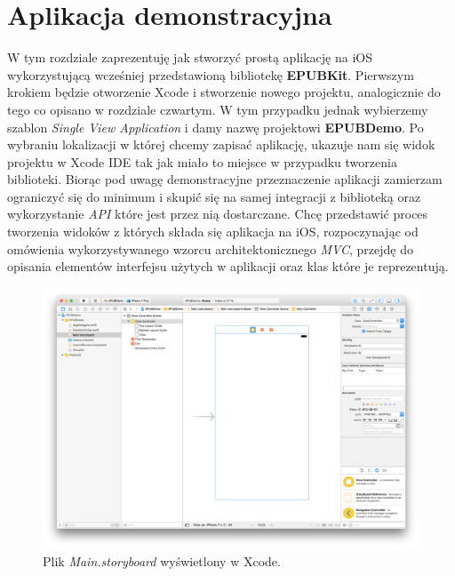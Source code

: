\chapter{Aplikacja demonstracyjna}

W tym rozdziale zaprezentuję jak stworzyć prostą aplikację na iOS wykorzystującą wcześniej przedstawioną bibliotekę \textbf{EPUBKit}. Pierwszym krokiem będzie otworzenie Xcode i stworzenie nowego projektu, analogicznie do tego co opisano w rozdziale czwartym. W tym przypadku jednak wybierzemy szablon \textit{Single View Application} i damy nazwę projektowi \textbf{EPUBDemo}. Po wybraniu lokalizacji w której chcemy zapisać aplikację, ukazuje nam się widok projektu w Xcode IDE tak jak miało to miejsce w przypadku tworzenia biblioteki. Biorąc pod uwagę demonstracyjne przeznaczenie aplikacji zamierzam ograniczyć się do minimum i skupić się na samej integracji z biblioteką oraz wykorzystanie \textit{API} które jest przez nią dostarczane. Chcę przedstawić proces tworzenia widoków z których składa się aplikacja na iOS, rozpoczynając od omówienia wykorzystywanego wzorcu architektonicznego \textit{MVC}, przejdę do opisania elementów interfejsu użytych w aplikacji oraz klas które je reprezentują.

\begin{figure}[ht!]
  \centering
  \includegraphics[width=120mm]{images/chapter-5-image-1-storyboard.png}
  \caption{Plik \textit{Main.storyboard} wyświetlony w Xcode.}
  \label{chapter-5-image-1-storyboard}
\end{figure}

